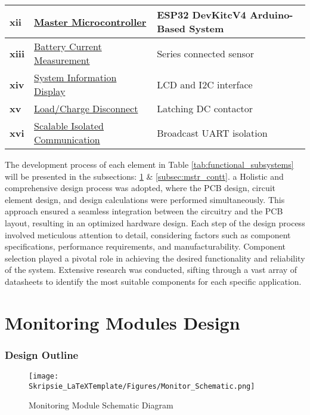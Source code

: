\begin{table}[h]
\begin{tabular}{|p{0.6cm}|p{}|p{8.4cm}|}
        \hline
        \textbf{xii} & \hyperref[subsubsec:ESP32_dsgn]{Master Microcontroller} & ESP32 DevKitcV4 Arduino-Based System\\
        \hline
        \textbf{xiii} & \hyperref[subsubsec:cur_sen_design]{Battery Current Measurement} & Series connected sensor \\
        \hline
        \textbf{xiv} & \hyperref[subsubsec:LCD_Dsgn]{System Information Display} & LCD and I2C interface \\
        \hline
        \textbf{xv} & \hyperref[subsubsec:relay_Dsgn]{Load/Charge Disconnect} & Latching DC contactor \\
        \hline
        \textbf{xvi} & \hyperref[subsubsec:iso_COMS_Mstr]{Scalable Isolated Communication} & Broadcast UART isolation \\
        \hline
    \end{tabular}
\end{table}

\noindent
The development process of each element in Table \ref{tab:functional_subsystems} will be presented in the subsections: \ref{subsec:moni_mods} \& \ref{subsec:mstr_contt}. a Holistic and comprehensive design process was adopted, where the PCB design, circuit element design, and design calculations were performed simultaneously. This approach ensured a seamless integration between the circuitry and the PCB layout, resulting in an optimized hardware design. Each step of the design process involved meticulous attention to detail, considering factors such as component specifications, performance requirements, and manufacturability. Component selection played a pivotal role in achieving the desired functionality and reliability of the system. Extensive research was conducted, sifting through a vast array of datasheets to identify the most suitable components for each specific application.
\section{Monitoring Modules Design}\label{subsec:moni_mods}
\subsubsection{Design Outline}\label{subsec:mmmm1}
\begin{figure}[h!]
\centering
\texttt{[image: Skripsie\_LaTeXTemplate/Figures/Monitor\_Schematic.png]}
\caption{Monitoring Module Schematic Diagram}
\label{fig:Monitor_Schema}
\end{figure}

